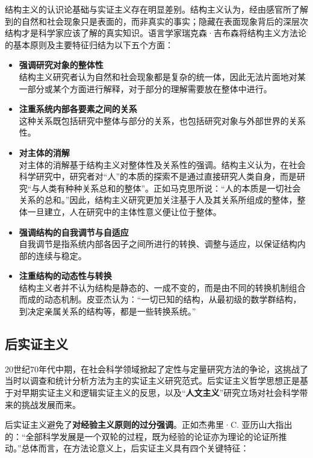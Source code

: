 结构主义的认识论基础与实证主义存在明显差别。结构主义认为，经由感官所了解到的自然和社会现象只是表面的，而非真实的事实；隐藏在表面现象背后的深层次结构才是科学家应该了解的真实知识。语言学家瑞克森·吉布森将结构主义方法论的基本原则及主要特征归结为以下五个方面：

\begin{itemize}
    \item \textbf{强调研究对象的整体性}\\
    结构主义研究者认为自然和社会现象都是复杂的统一体，因此无法片面地对某一部分或某个方面进行解释，对于部分的理解需要放在整体中进行。
    \item \textbf{注重系统内部各要素之间的关系}\\
    这种关系既包括研究中整体与部分的关系，也包括研究对象与外部世界的关系性。
    \item
    \textbf{对主体的消解}\\
    对主体的消解基于结构主义对整体性及关系性的强调。结构主义认为，在社会科学研究中，研究者对“人”的本质的探索不是通过直接研究人类自身，而是研究“与人类有种种关系总和的整体”。正如马克思所说：“人的本质是一切社会关系的总和。”因此，结构主义研究更加关注基于人及其关系所组成的整体，整体一旦建立，人在研究中的主体性意义便让位于整体。
    \item \textbf{强调结构的自我调节与自适应}\\
    自我调节是指系统内部各因子之间所进行的转换、调整与适应，以保证结构内部的连续与稳定。
    \item \textbf{注重结构的动态性与转换}\\
    结构主义者并不认为结构是静态的、一成不变的，而是由不同的转换机制组合而成的动态机制。皮亚杰认为：“一切已知的结构，从最初级的数学群结构，到决定亲属关系的结构等，都是一些转换系统。”
\end{itemize}

\subsection{后实证主义}

20世纪70年代中期，在社会科学领域掀起了定性与定量研究方法的争论，这挑战了当时以调查和统计分析方法为主的实证主义研究范式。后实证主义哲学思想正是基于对早期实证主义和逻辑实证主义的反思，以及“\textbf{人文主义}”研究立场对社会科学带来的挑战发展而来。

后实证主义避免了\textbf{对经验主义原则的过分强调}。正如杰弗里·C.
亚历山大指出的：“全部科学发展是一个双轮的过程，既为经验的论证亦为理论的论证所推动。”总体而言，在方法论意义上，后实证主义具有四个关键特征：

